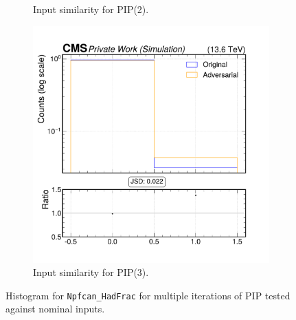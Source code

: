\begin{figure}[h]
\begin{subfigure}[t]{0.32\textwidth}
    \caption{Input similarity for PIP(2).}
  \end{subfigure}\hfill
  \begin{subfigure}[t]{0.32\textwidth}
    \includegraphics[width=\linewidth]{media/output/features/compare/intprob_3/cmp_npf_arr_Npfcan_HadFrac.pdf}
    \caption{Input similarity for PIP(3).}
  \end{subfigure}

  \caption{Histogram for \texttt{Npfcan\_HadFrac} for multiple iterations of PIP tested against nominal inputs.}
  \label{fig:intprob_input_Npfcan_HadFrac}
\end{figure}
